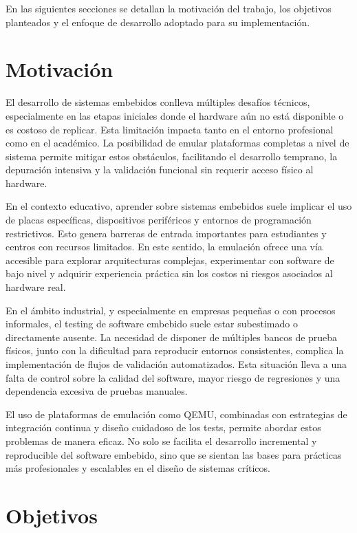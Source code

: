 En las siguientes secciones se detallan la motivación del trabajo, los objetivos planteados y el enfoque de desarrollo adoptado para su implementación.

\section{Motivación}

El desarrollo de sistemas embebidos conlleva múltiples desafíos técnicos, especialmente en las etapas iniciales donde el hardware aún no está disponible o es costoso de replicar. Esta limitación impacta tanto en el entorno profesional como en el académico. La posibilidad de emular plataformas completas a nivel de sistema permite mitigar estos obstáculos, facilitando el desarrollo temprano, la depuración intensiva y la validación funcional sin requerir acceso físico al hardware.

En el contexto educativo, aprender sobre sistemas embebidos suele implicar el uso de placas específicas, dispositivos periféricos y entornos de programación restrictivos. Esto genera barreras de entrada importantes para estudiantes y centros con recursos limitados. En este sentido, la emulación ofrece una vía accesible para explorar arquitecturas complejas, experimentar con software de bajo nivel y adquirir experiencia práctica sin los costos ni riesgos asociados al hardware real.

En el ámbito industrial, y especialmente en empresas pequeñas o con procesos informales, el testing de software embebido suele estar subestimado o directamente ausente. La necesidad de disponer de múltiples bancos de prueba físicos, junto con la dificultad para reproducir entornos consistentes, complica la implementación de flujos de validación automatizados. Esta situación lleva a una falta de control sobre la calidad del software, mayor riesgo de regresiones y una dependencia excesiva de pruebas manuales.

El uso de plataformas de emulación como QEMU, combinadas con estrategias de integración continua y diseño cuidadoso de los tests, permite abordar estos problemas de manera eficaz. No solo se facilita el desarrollo incremental y reproducible del software embebido, sino que se sientan las bases para prácticas más profesionales y escalables en el diseño de sistemas críticos.


\section{Objetivos}


